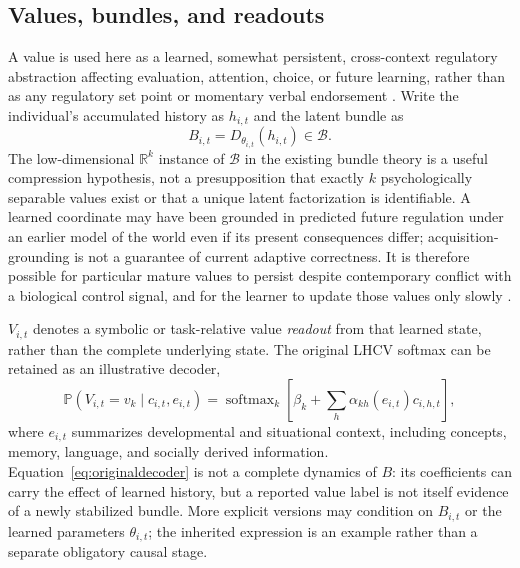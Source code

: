 \documentclass[11pt,a4paper]{article}
\newcommand{\PP}{\mathbb P}
\begin{document}
\subsection{Values, bundles, and readouts}
A value is used here as a learned, somewhat persistent, cross-context regulatory abstraction affecting evaluation, attention, choice, or future learning, rather than as any regulatory set point or momentary verbal endorsement \citep{zarnckeEmbedded}. Write the individual's accumulated history as $h_{i,t}$ and the latent bundle as
\begin{equation}
 B_{i,t}=D_{\theta_{i,t}}(h_{i,t})\in\mathcal B. \label{eq:bundle}
\end{equation}
The low-dimensional $\mathbb R^k$ instance of $\mathcal B$ in the existing bundle theory is a useful compression hypothesis, not a presupposition that exactly $k$ psychologically separable values exist or that a unique latent factorization is identifiable. A learned coordinate may have been grounded in predicted future regulation under an earlier model of the world even if its present consequences differ; acquisition-grounding is not a guarantee of current adaptive correctness. It is therefore possible for particular mature values to persist despite contemporary conflict with a biological control signal, and for the learner to update those values only slowly \citep{zarnckeEmbedded}.

$V_{i,t}$ denotes a symbolic or task-relative value \emph{readout} from that learned state, rather than the complete underlying state. The original LHCV softmax can be retained as an illustrative decoder,
\begin{equation}
 \PP(V_{i,t}=v_k\mid c_{i,t},e_{i,t})
 =\operatorname{softmax}_k\!\left[\beta_k+\sum_h\alpha_{kh}(e_{i,t})c_{i,h,t}\right],
 \label{eq:originaldecoder}
\end{equation}
where $e_{i,t}$ summarizes developmental and situational context, including concepts, memory, language, and socially derived information. Equation~\eqref{eq:originaldecoder} is not a complete dynamics of $B$: its coefficients can carry the effect of learned history, but a reported value label is not itself evidence of a newly stabilized bundle. More explicit versions may condition on $B_{i,t}$ or the learned parameters $\theta_{i,t}$; the inherited expression is an example rather than a separate obligatory causal stage.
\end{document}
